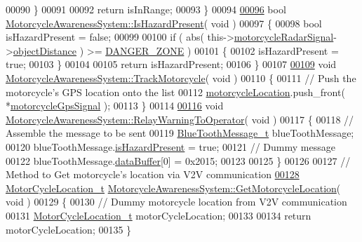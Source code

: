 \begin{DoxyCode}
00090     \}
00091 
00092     \textcolor{keywordflow}{return} isInRange;
00093 \}
00094 
\hypertarget{MotorcycleAwarenessSystem_8cpp_source_l00096}{}\hyperlink{classMotorcycleAwarenessSystem_a35d59c8299b0d5ef43c10306cc7f2ee1}{00096} \textcolor{keywordtype}{bool} \hyperlink{classMotorcycleAwarenessSystem_a35d59c8299b0d5ef43c10306cc7f2ee1}{MotorcycleAwarenessSystem::IsHazardPresent}( \textcolor{keywordtype}{void} )
00097 \{
00098     \textcolor{keywordtype}{bool} isHazardPresent = \textcolor{keyword}{false};
00099 
00100     \textcolor{keywordflow}{if} ( abs( this->\hyperlink{classMotorcycleAwarenessSystem_a0744e71b9f440a86f5078c876ba7629b}{motorcycleRadarSignal}->\hyperlink{structRadarSignal__t_a96938fbfb77f208743a36d3f8b37cccb}{objectDistance} ) >= 
      \hyperlink{classMotorcycleAwarenessSystem_abe0296f34c0ca2857a94659dfdc5801c}{DANGER\_ZONE} )
00101     \{
00102         isHazardPresent = \textcolor{keyword}{true};
00103     \}
00104 
00105     \textcolor{keywordflow}{return} isHazardPresent;
00106 \}
00107 
\hypertarget{MotorcycleAwarenessSystem_8cpp_source_l00109}{}\hyperlink{classMotorcycleAwarenessSystem_a4e6eec23ec46e24ee377a3c94e15eba4}{00109} \textcolor{keywordtype}{void} \hyperlink{classMotorcycleAwarenessSystem_a4e6eec23ec46e24ee377a3c94e15eba4}{MotorcycleAwarenessSystem::TrackMotorcycle}( \textcolor{keywordtype}{void} )
00110 \{
00111     \textcolor{comment}{// Push the motorcycle's GPS location onto the list}
00112     \hyperlink{classMotorcycleAwarenessSystem_af6becfeb1d11b467cb80a94a8e6940ac}{motorcycleLocation}.push\_front( *\hyperlink{classMotorcycleAwarenessSystem_ab281a3993b574923b2f379ed0477b2d4}{motorcycleGpsSignal} );
00113 \}
00114 
\hypertarget{MotorcycleAwarenessSystem_8cpp_source_l00116}{}\hyperlink{classMotorcycleAwarenessSystem_aec5e4731c6bf0789821ba2793918e3ee}{00116} \textcolor{keywordtype}{void} \hyperlink{classMotorcycleAwarenessSystem_aec5e4731c6bf0789821ba2793918e3ee}{MotorcycleAwarenessSystem::RelayWarningToOperator}( \textcolor{keywordtype}{
      void} )
00117 \{
00118     \textcolor{comment}{// Assemble the message to be sent}
00119     \hyperlink{structBlueToothMessage__t}{BlueToothMessage\_t} blueToothMessage;
00120     blueToothMessage.\hyperlink{structBlueToothMessage__t_a2dd315aa1cba1d2d3045e26b9f171e61}{isHazardPresent} = \textcolor{keyword}{true};
00121     \textcolor{comment}{// Dummy message}
00122     blueToothMessage.\hyperlink{structBlueToothMessage__t_ab872789a32f068dae8bcf77122256b78}{dataBuffer}[0] = 0x2015;
00123 
00125 \}
00126 
00127 \textcolor{comment}{// Method to Get motorcycle's location via V2V communication}
\hypertarget{MotorcycleAwarenessSystem_8cpp_source_l00128}{}\hyperlink{classMotorcycleAwarenessSystem_a840a5bc17d75276ecdb3a39d7aaf4109}{00128} \hyperlink{structMotorCycleLocation__t}{MotorCycleLocation\_t} 
      \hyperlink{classMotorcycleAwarenessSystem_a840a5bc17d75276ecdb3a39d7aaf4109}{MotorcycleAwarenessSystem::GetMotorcycleLocation}( \textcolor{keywordtype}{void} )
00129 \{
00130     \textcolor{comment}{// Dummy motorcycle location from V2V communication}
00131     \hyperlink{structMotorCycleLocation__t}{MotorCycleLocation\_t} motorCycleLocation;
00133 
00134     \textcolor{keywordflow}{return} motorCycleLocation;
00135 \}
\end{DoxyCode}
